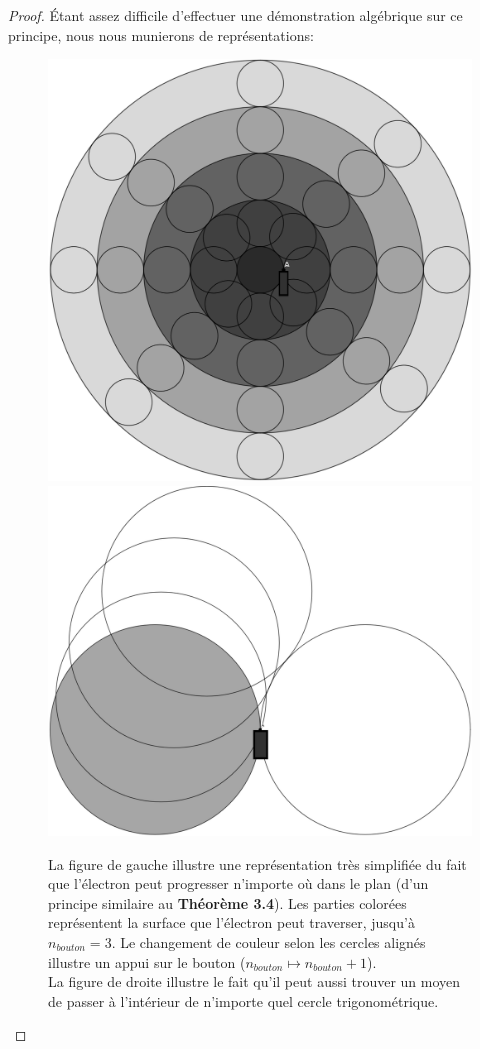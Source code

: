 \documentclass{amsart}
\theoremstyle{definition}
\theoremstyle{remark}
\numberwithin{equation}{section}
\begin{document}
\begin{proof}

  Étant assez difficile d'effectuer une démonstration algébrique sur ce principe, nous nous munierons de représentations:

  \begin{figure}[H]
    \centering
    \includegraphics[scale=0.13]{images/it_can.png}
    \includegraphics[scale=0.12]{images/it_can2.png}
    \caption{La figure de gauche illustre une représentation très simplifiée du fait que l'électron peut progresser n'importe où dans le plan (d'un principe similaire au \textbf{Théorème 3.4}). Les parties colorées représentent la surface que l'électron peut traverser, jusqu'à $n_{bouton}=3$. Le changement de couleur selon les cercles alignés
    illustre un appui sur le bouton ($n_{bouton} \longmapsto n_{bouton}+1$). \\ La figure de droite illustre le fait qu'il peut aussi trouver un moyen de passer à l'intérieur de n'importe quel cercle trigonométrique.}
  \end{figure}


\end{proof}
\end{document}
